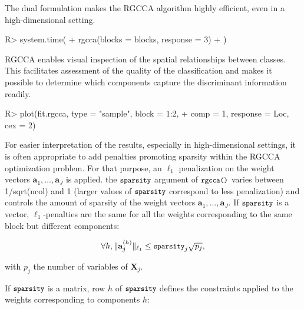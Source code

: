 \documentclass[
]{jss}
\begin{document}
\normalsize

The dual formulation makes the RGCCA algorithm highly efficient, even in
a high-dimensional setting.

\footnotesize

\begin{CodeChunk}
\begin{CodeInput}
R> system.time(
+   rgcca(blocks = blocks, response = 3)
+ )
\end{CodeInput}
\end{CodeChunk}

\normalsize

RGCCA enables visual inspection of the spatial relationships between
classes. This facilitates assessment of the quality of the
classification and makes it possible to determine which components
capture the discriminant information readily.

\footnotesize

\begin{CodeChunk}
\begin{CodeInput}
R> plot(fit.rgcca, type = "sample", block = 1:2,
+      comp = 1, response = Loc, cex = 2)
\end{CodeInput}
\end{CodeChunk}

\normalsize

For easier interpretation of the results, especially in high-dimensional
settings, it is often appropriate to add penalties promoting sparsity
within the RGCCA optimization problem. For that purpose, an \(\ell_1\)
penalization on the weight vectors
\(\mathbf{a}_1, \ldots, \mathbf{a}_J\) is applied. the
\(\small{\texttt{sparsity}}\) argument of \(\small{\texttt{rgcca()}}\)
varies between 1/sqrt(ncol) and 1 (larger values of
\(\small{\texttt{sparsity}}\) correspond to less penalization) and
controls the amount of sparsity of the weight vectors
\(\mathbf{a}_1, \ldots, \mathbf{a}_J\). If \(\small{\texttt{sparsity}}\)
is a vector, \(\ell_1\)-penalties are the same for all the weights
corresponding to the same block but different components:

\begin{equation}
\forall h, \Vert \mathbf{a}_j^{(h)} \Vert_{\ell_1} \leq \small{\texttt{sparsity}}_j \sqrt{p_j},
\end{equation}

with \(p_j\) the number of variables of \(\mathbf X_j\).

If \(\small{\texttt{sparsity}}\) is a matrix, row \(h\) of
\(\small{\texttt{sparsity}}\) defines the constraints applied to the
weights corresponding to components \(h\):
\end{document}
